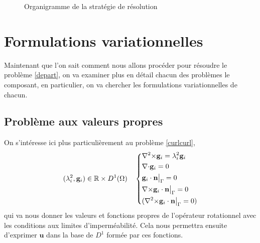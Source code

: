 \begin{figure}[H]
\caption{Organigramme de la stratégie de résolution}\label{org1}
\end{figure}

\chapter{Formulations variationnelles}
\label{fv}
Maintenant que l'on sait comment nous allons procéder pour résoudre le problème \ref{depart}, on va examiner plus en détail chacun des problèmes le composant, en particulier, on va chercher les formulations variationnelles de chacun.

\section{Problème aux valeurs propres}
\label{eigen}
On s'intéresse ici plus particulièrement au problème \ref{curlcurl},
\begin{equation*}
(\lambda_i^2,\mathbf{g}_i)\in{\mathbb{R}}\times D^1(\Omega)\quad \left\{\begin{aligned}
&{\nabla^2\times}  \mathbf{g}_i = \lambda_i^2 \mathbf{g}_i\\
&{\nabla\cdot} \mathbf{g}_i = 0\\
&\mathbf{g}_i\cdot \mathbf{n}{\big\rvert_{\Gamma}} = 0\\
&{\nabla\times} \mathbf{g}_i\cdot \mathbf{n}{\big\rvert_{\Gamma}} = 0\\
&({\nabla^2\times}  \mathbf{g}_i\cdot \mathbf{n}{\big\rvert_{\Gamma}} = 0)
\end{aligned}\right.
\end{equation*}
qui va nous donner les valeurs et fonctions propres de l'opérateur rotationnel avec les conditions aux limites d'imperméabilité. Cela nous permettra ensuite d'exprimer $\mathbf{u}$ dans la base de $D^1$ formée par ces fonctions.\\


